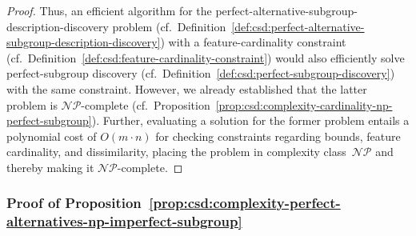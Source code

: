 \begin{proof}
	Thus, an efficient algorithm for the perfect-alternative-subgroup-description-discovery problem (cf.~Definition~\ref{def:csd:perfect-alternative-subgroup-description-discovery}) with a feature-cardinality constraint (cf.~Definition~\ref{def:csd:feature-cardinality-constraint}) would also efficiently solve perfect-subgroup discovery (cf.~Definition~\ref{def:csd:perfect-subgroup-discovery}) with the same constraint.
	However, we already established that the latter problem is $\mathcal{NP}$-complete (cf.~Proposition~\ref{prop:csd:complexity-cardinality-np-perfect-subgroup}).
	Further, evaluating a solution for the former problem entails a polynomial cost of $O(m \cdot n)$ for checking constraints regarding bounds, feature cardinality, and dissimilarity, placing the problem in complexity class~$\mathcal{NP}$ and thereby making it $\mathcal{NP}$-complete.
\end{proof}

\subsubsection{Proof of Proposition~\ref{prop:csd:complexity-perfect-alternatives-np-imperfect-subgroup}}
\label{sec:appendix:csd:proofs:complexity-perfect-alternatives-np-imperfect-subgroup}

